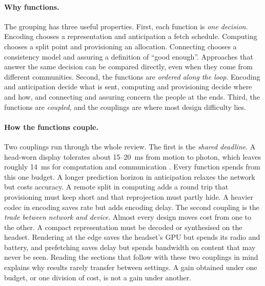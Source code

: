 \paragraph{Why functions.} The grouping has three useful properties. First, each function is
\emph{one decision}. Encoding chooses a representation and anticipation a fetch schedule. Computing
chooses a split point and provisioning an allocation. Connecting chooses a consistency model and assuring
a definition of ``good enough''. Approaches that answer the same decision can be compared directly, even
when they come from different communities. Second, the functions are \emph{ordered along the loop}.
Encoding and anticipation decide what is sent, computing and provisioning decide where and how, and
connecting and assuring concern the people at the ends. Third, the functions are \emph{coupled}, and the
couplings are where most design difficulty lies.

\paragraph{How the functions couple.} Two couplings run through the whole review. The first is the
\emph{shared deadline}. A head-worn display tolerates about 15--20~ms from motion to photon, which
leaves roughly 14~ms for computation and communication \cite{W2784711283}. Every function spends from
this one budget. A longer prediction horizon in anticipation relaxes the network but costs accuracy. A
remote split in computing adds a round trip that provisioning must keep short and that reprojection must
partly hide. A heavier codec in encoding saves rate but adds encoding delay. The second coupling is the
\emph{trade between network and device}. Almost every design moves cost from one to the other. A compact
representation must be decoded or synthesised on the headset. Rendering at the edge saves the headset's
GPU but spends its radio and battery, and prefetching saves delay but spends bandwidth on content that
may never be seen. Reading the sections that follow with these two couplings in mind explains why
results rarely transfer between settings. A gain obtained under one budget, or one division of cost, is
not a gain under another.

